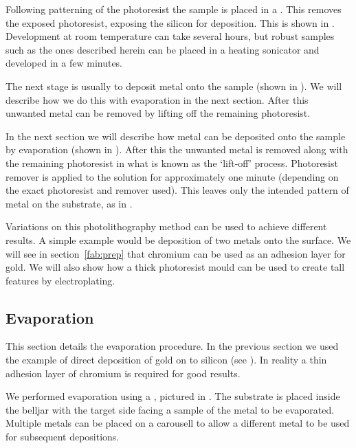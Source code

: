 Following patterning of the photoresist the sample is placed in a . This removes the exposed photoresist, exposing the silicon for
deposition. This is shown in . Development at
room temperature can take several hours, but robust samples such as the ones
described herein can be placed in a heating sonicator and developed in a few
minutes.

The next stage is usually to deposit metal onto the sample (shown in
). We will describe how we do this with
evaporation in the next section. After this unwanted metal can be removed by
lifting off the remaining photoresist. 

In the next section we will describe how metal can be deposited onto the sample
by evaporation (shown in ). After this the
unwanted metal is removed along with the remaining photoresist in what is known
as the `lift-off' process. Photoresist remover is applied to the solution for
approximately one minute (depending on the exact photoresist and remover used).
This leaves only the intended pattern of metal on the substrate, as in
.

Variations on this photolithography method can be used to achieve different
results. A simple example would be deposition of two metals onto the surface.
We will see in section~\ref{fab:prep} that chromium can be used as an
adhesion layer for gold. We will also show how a thick photoresist mould can be
used to create tall features by electroplating. 

\subsection{Evaporation}
\label{fab:evap}

This section details the evaporation procedure. In the previous section we used
the example of direct deposition of gold on to silicon (see
). In reality a thin adhesion layer of chromium
is required for good results.~\cite{}

We performed evaporation using a ,
pictured in .
The substrate is placed inside the belljar with the target side facing a sample
of the metal to be evaporated. Multiple metals can be placed on a carousell to
allow a different metal to be used for subsequent depositions.


